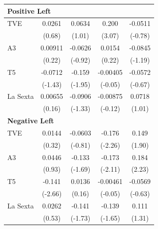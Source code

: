 \documentclass[12pt]{article}
\begin{document}
\begin{table}[htbp]
\begin{tabular}{lcccc}
			\multicolumn{5}{l}{\textbf{Positive Left}}\\
			\hline
			TVE            &  0.0261         &  0.0634         &  0.200\sym{**}  & -0.0511         \\
			&  (0.68)         &  (1.01)         &  (3.07)         & (-0.78)         \\
			A3             &  0.00911        & -0.0626         &  0.0154         & -0.0845         \\
			&  (0.22)         & (-0.92)         &  (0.22)         & (-1.19)         \\
			T5             & -0.0712         & -0.159          & -0.00405        & -0.0572         \\
			& (-1.43)         & (-1.95)         & (-0.05)         & (-0.67)         \\
			La Sexta       &  0.00655        & -0.0906         & -0.00875        &  0.0718         \\
			&  (0.16)         & (-1.33)         & (-0.12)         &  (1.01)         \\
			\hline
			
			\multicolumn{5}{l}{\textbf{Negative Left}}\\
			\hline
			TVE            &  0.0144         & -0.0603         & -0.176\sym{*}   &  0.149          \\
			&  (0.32)         & (-0.81)         & (-2.26)         &  (1.90)         \\
			A3             &  0.0446         & -0.133          & -0.173\sym{*}   &  0.184\sym{*}   \\
			&  (0.93)         & (-1.69)         & (-2.11)         &  (2.23)         \\
			T5             & -0.141\sym{**}  &  0.0136         & -0.00461        & -0.0569         \\
			& (-2.66)         &  (0.16)         & (-0.05)         & (-0.63)         \\
			La Sexta       &  0.0262         & -0.141          & -0.139          &  0.111          \\
			&  (0.53)         & (-1.73)         & (-1.65)         &  (1.31)         \\
			\hline
			

\end{tabular}
\end{table}
\end{document}
